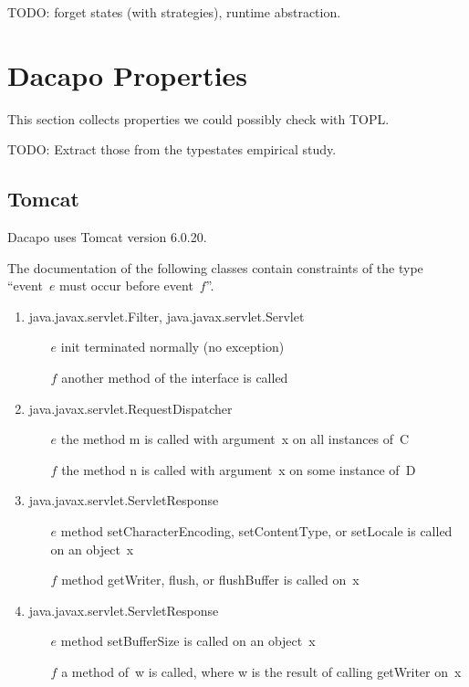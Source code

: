\documentclass{article} %
\begin{document}
TODO: forget states (with strategies), runtime abstraction.

\section{Dacapo Properties} %

This section collects properties we could possibly check with TOPL\null.

TODO: Extract those from the typestates empirical study.

\subsection{Tomcat} %

Dacapo uses Tomcat version 6.0.20.

The documentation of the following classes contain constraints of the type ``event~$e$ must occur before event~$f$''.

\begin{enumerate}
\item
\textsf{java.javax.servlet.Filter}, \textsf{java.javax.servlet.Servlet}
  \begin{itemize}
  \item[$e$] \textsf{init} terminated normally (no exception)
  \item[$f$] another method of the interface is called
  \end{itemize}
\item
\textsf{java.javax.servlet.RequestDispatcher}
  \begin{itemize}
  \item[$e$] the method \textsf{m} is called with argument~\textsf{x} on all instances of~\textsf{C}
  \item[$f$] the method \textsf{n} is called with argument~\textsf{x} on some instance of~\textsf{D}
  \end{itemize}
\item
\textsf{java.javax.servlet.ServletResponse}
  \begin{itemize}
  \item[$e$] method \textsf{setCharacterEncoding}, \textsf{setContentType}, or \textsf{setLocale} is called on an object~\textsf{x}
  \item[$f$] method \textsf{getWriter}, \textsf{flush}, or \textsf{flushBuffer} is called on~\textsf{x}
  \end{itemize}
\item
\textsf{java.javax.servlet.ServletResponse}
  \begin{itemize}
  \item[$e$] method \textsf{setBufferSize} is called on an object~\textsf{x}
  \item[$f$] a method of~\textsf{w} is called, where \textsf{w} is the result of calling \textsf{getWriter} on~\textsf{x}
  \end{itemize}
\end{enumerate}
\end{document}
